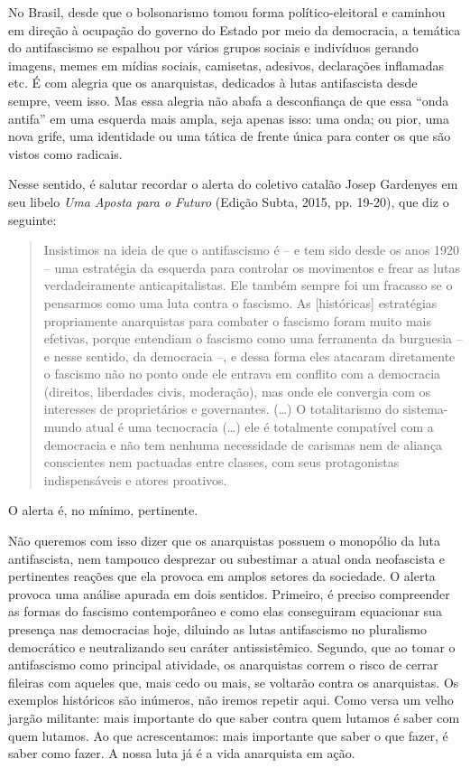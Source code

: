 No Brasil, desde que o bolsonarismo tomou forma político-eleitoral e caminhou em direção à ocupação do governo do Estado por meio da democracia, a temática do antifascismo se espalhou por vários grupos sociais e indivíduos gerando imagens, memes em mídias sociais, camisetas, adesivos, declarações inflamadas etc. É com alegria que os anarquistas, dedicados à lutas antifascista desde sempre, veem isso. Mas essa alegria não abafa a desconfiança de que essa “onda antifa” em uma esquerda mais ampla, seja apenas isso: uma onda; ou pior, uma nova grife, uma identidade ou uma tática de frente única para conter os que são vistos como radicais.

Nesse sentido, é salutar recordar o alerta do coletivo catalão Josep Gardenyes em seu libelo \emph{Uma Aposta para o Futuro} (Edição Subta, 2015, pp. 19-20), que diz o seguinte: 

\begin{quote}
Insistimos na ideia de que o antifascismo é – e tem sido desde os anos 1920 – uma estratégia da esquerda para controlar os movimentos e frear as lutas verdadeiramente anticapitalistas. Ele também sempre foi um fracasso se o pensarmos como uma luta contra o fascismo. As [históricas] estratégias propriamente anarquistas para combater o fascismo foram muito mais efetivas, porque entendiam o fascismo como uma ferramenta da burguesia – e nesse sentido, da democracia –, e dessa forma eles atacaram diretamente o fascismo não no ponto onde ele entrava em conflito com a democracia (direitos, liberdades civis, moderação), mas onde ele convergia com os interesses de proprietários e governantes. (…) O totalitarismo do sistema-mundo atual é uma tecnocracia (…) ele é totalmente compatível com a democracia e não tem nenhuma necessidade de carismas nem de aliança conscientes nem pactuadas entre classes, com seus protagonistas indispensáveis e atores proativos.
\end{quote}

O alerta é, no mínimo, pertinente.

Não queremos com isso dizer que os anarquistas possuem o monopólio da luta antifascista, nem tampouco desprezar ou subestimar a atual onda neofascista e pertinentes reações que ela provoca em amplos setores da sociedade. O alerta provoca uma análise apurada em dois sentidos. Primeiro, é preciso compreender as formas do fascismo contemporâneo e como elas conseguiram equacionar sua presença nas democracias hoje, diluindo as lutas antifascismo no pluralismo democrático e neutralizando seu caráter antissistêmico. Segundo, que ao tomar o antifascismo como principal atividade, os anarquistas correm o risco de cerrar fileiras com aqueles que, mais cedo ou mais, se voltarão contra os anarquistas. Os exemplos históricos são inúmeros, não iremos repetir aqui. Como versa um velho jargão militante: mais importante do que saber contra quem lutamos é saber com quem lutamos. Ao que acrescentamos: mais importante que saber o que fazer, é saber como fazer. A nossa luta já é a vida anarquista em ação.

